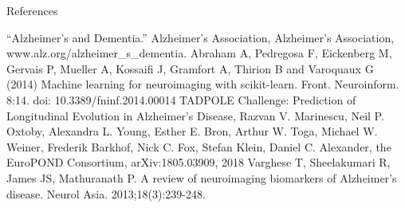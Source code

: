 \documentclass[final]{beamer}
\newlength{\onecolwid}
\begin{document}
\begin{frame}[t]
\begin{columns}[t]
\begin{column}{\onecolwid}
\begin{block}{References}
        {
            
            \small
            \vspace{0.2in}
            \linebreak ``Alzheimer's and Dementia.'' Alzheimer's Association, Alzheimer's Association, www.alz.org/alzheimer\_s\_dementia.
            \linebreak
            \linebreak Abraham A, Pedregosa F, Eickenberg M, Gervais P, Mueller A, Kossaifi J, Gramfort A, Thirion B and Varoquaux G (2014) Machine learning for neuroimaging with scikit-learn. Front. Neuroinform. 8:14. doi: 10.3389/fninf.2014.00014
            \linebreak
            \linebreak TADPOLE Challenge: Prediction of Longitudinal Evolution in Alzheimer's Disease, Razvan V. Marinescu, Neil P. Oxtoby, Alexandra L. Young, Esther E. Bron, Arthur W. Toga, Michael W. Weiner, Frederik Barkhof, Nick C. Fox, Stefan Klein, Daniel C. Alexander, the EuroPOND Consortium, arXiv:1805.03909, 2018
            \linebreak
            \linebreak Varghese T, Sheelakumari R, James JS, Mathuranath P. A review of neuroimaging biomarkers of Alzheimer's disease. Neurol Asia. 2013;18(3):239-248.
            
           \vspace{2cm}
            
        }
        
        \end{block}
        
        
        
        
        

\end{column}
\end{columns}
\end{frame}
\end{document}
